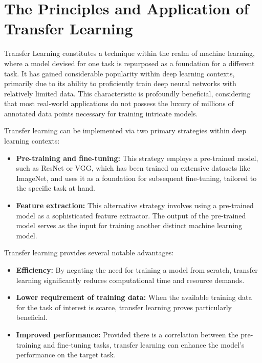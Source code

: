 \renewcommand{\figurepath}[1]{Chapters/drive_net/figures/#1}

\chapter{The Principles and Application of Transfer Learning}\label{ch:transfer_learning}

Transfer Learning constitutes a technique within the realm of machine learning, where a model devised for one task is repurposed as a foundation for a different task. It has gained considerable popularity within deep learning contexts, primarily due to its ability to proficiently train deep neural networks with relatively limited data. This characteristic is profoundly beneficial, considering that most real-world applications do not possess the luxury of millions of annotated data points necessary for training intricate models.

Transfer learning can be implemented via two primary strategies within deep learning contexts:

\begin{itemize}
    \item \textbf{Pre-training and fine-tuning:} This strategy employs a pre-trained model, such as ResNet or VGG, which has been trained on extensive datasets like ImageNet, and uses it as a foundation for subsequent fine-tuning, tailored to the specific task at hand.
    \item \textbf{Feature extraction:} This alternative strategy involves using a pre-trained model as a sophisticated feature extractor. The output of the pre-trained model serves as the input for training another distinct machine learning model.
\end{itemize}

Transfer learning provides several notable advantages:

\begin{itemize}
    \item \textbf{Efficiency:} By negating the need for training a model from scratch, transfer learning significantly reduces computational time and resource demands.
    \item \textbf{Lower requirement of training data:} When the available training data for the task of interest is scarce, transfer learning proves particularly beneficial.
    \item \textbf{Improved performance:} Provided there is a correlation between the pre-training and fine-tuning tasks, transfer learning can enhance the model's performance on the target task.
\end{itemize}

